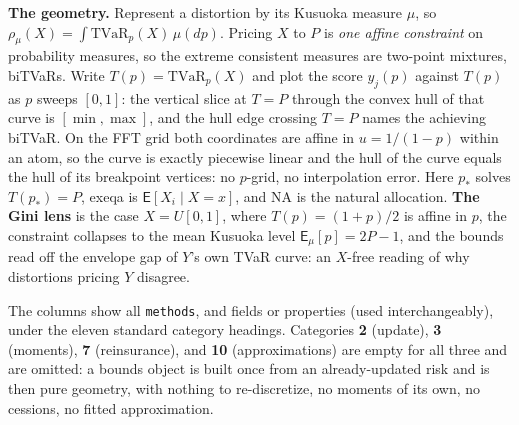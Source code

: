 \smallskip
{\bf The geometry.} Represent a distortion by its Kusuoka measure $\mu$, so $\rho_\mu(X) = \int \mathrm{TVaR}_p(X)\,\mu(dp)$. Pricing $X$ to $P$ is {\it one affine constraint} on probability measures, so the extreme consistent measures are two-point mixtures, biTVaRs. Write $T(p) = \mathrm{TVaR}_p(X)$ and plot the score $y_j(p)$ against $T(p)$ as $p$ sweeps $[0,1]$: the vertical slice at $T = P$ through the convex hull of that curve is $[\min, \max]$, and the hull edge crossing $T = P$ names the achieving biTVaR. On the FFT grid both coordinates are affine in $u = 1/(1-p)$ within an atom, so the curve is exactly piecewise linear and the hull of the curve equals the hull of its breakpoint vertices: no $p$-grid, no interpolation error. Here $p_\ast$ solves $T(p_\ast) = P$, exeqa is $\mathsf{E}[X_i \mid X = x]$, and NA is the natural allocation. {\bf The Gini lens} is the case $X = U[0,1]$, where $T(p) = (1+p)/2$ is affine in $p$, the constraint collapses to the mean Kusuoka level $\mathsf{E}_\mu[p] = 2P - 1$, and the bounds read off the envelope gap of $Y$'s own TVaR curve: an $X$-free reading of why distortions pricing $Y$ disagree.

\smallskip
The columns show all \texttt{\m methods}, and fields or properties (used interchangeably), under the eleven standard category headings. Categories {\bf 2} (update), {\bf 3} (moments), {\bf 7} (reinsurance), and {\bf 10} (approximations) are empty for all three and are omitted: a bounds object is built once from an already-updated risk and is then pure geometry, with nothing to re-discretize, no moments of its own, no cessions, no fitted approximation.


